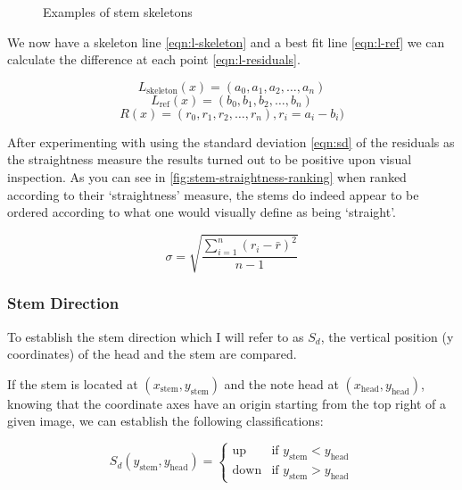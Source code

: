 \begin{figure}[h!]
    \caption{Examples of stem skeletons}
    \label{fig:stem-skeletons}
\end{figure}

We now have a skeleton line \cref{eqn:l-skeleton} and a best fit line \cref{eqn:l-ref} we can calculate the difference at each point \cref{eqn:l-residuals}.

\begin{equation} \label{eqn:l-skeleton}
    L_{\text{skeleton}}(x) = (a_0, a_1, a_2, \ldots, a_n)
\end{equation}
\begin{equation} \label{eqn:l-ref}
    L_{\text{ref}}(x) = (b_0, b_1, b_2, \ldots, b_n)
\end{equation}
\begin{equation} \label{eqn:l-residuals}
    R(x) = (r_0, r_1, r_2, \ldots, r_n), r_i = a_i - b_i)
\end{equation}


After experimenting with using the standard deviation \cref{eqn:sd} of the residuals as the straightness measure the results turned out to be positive upon visual inspection. As you can see in \cref{fig:stem-straightness-ranking} when ranked according to their `straightness' measure, the stems do indeed appear to be ordered according to what one would visually define as being `straight'.

\begin{equation} \label{eqn:sd}
\sigma = \sqrt{\frac{\sum\limits_{i=1}^{n}\left(r_{i} - \bar{r}\right)^{2}}{n-1}}
\end{equation}




\subsubsection{Stem Direction}

To establish the stem direction which I will refer to as $S_d$, the vertical position (y coordinates) of the head and the stem are compared.

If the stem is located at $(x_{\text{stem}}, y_{\text{stem}})$ and the note head at $(x_{\text{head}}, y_{\text{head}})$, knowing that the coordinate axes have an origin starting from the top right of a given image, we can establish the following classifications:

$$
S_{d} (y_{\text{stem}}, y_{\text{head}}) =
\left\{
	\begin{array}{ll}
		\text{up}   & \mbox{if } y_{\text{stem}} < y_{\text{head}} \\
		\text{down} & \mbox{if } y_{\text{stem}} > y_{\text{head}}
	\end{array}
\right.
$$

